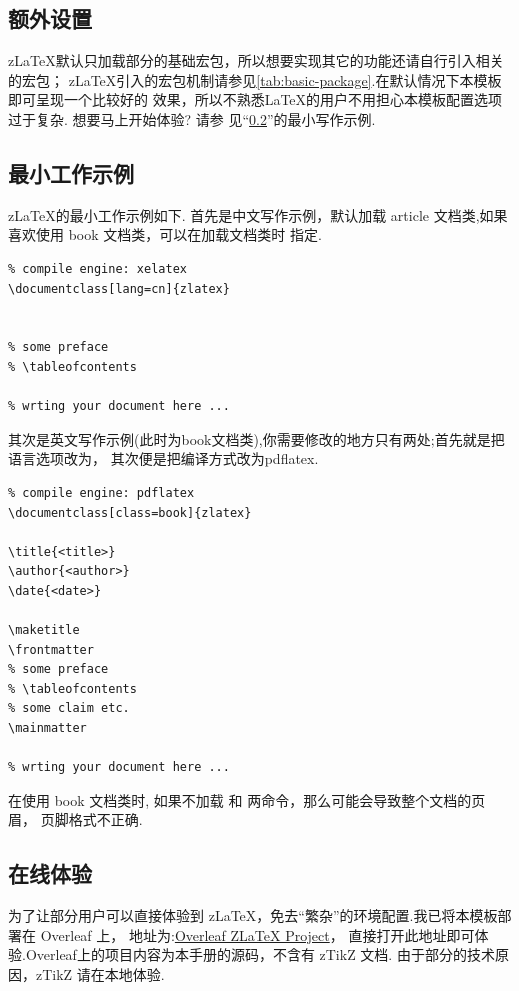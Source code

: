 \subsection{额外设置}
z\LaTeX{}默认只加载部分的基础宏包，所以想要实现其它的功能还请自行引入相关的宏包；
z\LaTeX{}引入的宏包机制请参见\cref{tab:basic-package}.在默认情况下本模板即可呈现一个比较好的
效果，所以不熟悉\LaTeX{}的用户不用担心本模板配置选项过于复杂. 想要马上开始体验? 请参
见``\cref{最小工作示例}''的最小写作示例.

\subsection{最小工作示例}\label{最小工作示例}
z\LaTeX{}的最小工作示例如下.
首先是中文写作示例，默认加载 {article} 文档类,如果喜欢使用 {book} 文档类，可以在加载文档类时
指定.

\begin{verbatim}
% compile engine: xelatex 
\documentclass[lang=cn]{zlatex}


% some preface
% \tableofcontents

% wrting your document here ...

\end{verbatim}

其次是英文写作示例(此时为{book}文档类),你需要修改的地方只有两处;首先就是把语言选项改为，
其次便是把编译方式改为{pdflatex}.

\begin{verbatim}
% compile engine: pdflatex 
\documentclass[class=book]{zlatex}

\title{<title>}
\author{<author>}
\date{<date>}

\maketitle
\frontmatter
% some preface
% \tableofcontents
% some claim etc.
\mainmatter

% wrting your document here ...

\end{verbatim}

在使用 book 文档类时, 如果不加载 \cmd{\frontmatter} 和 \cmd{\mainmatter} 两命令，那么可能会导致整个文档的页眉，
页脚格式不正确.

\subsection{在线体验}
为了让部分用户可以直接体验到 z\LaTeX{}，免去``繁杂''的环境配置.我已将本模板部署在 Overleaf 上，
地址为:\href{https://www.overleaf.com/project/661fd2772cafbff9df5e6fb4}{Overleaf ZLaTeX Project}，
直接打开此地址即可体验.Overleaf上的项目内容为本手册的源码，不含有 zTikZ 文档. 由于部分的技术原因，zTikZ 
请在本地体验.


